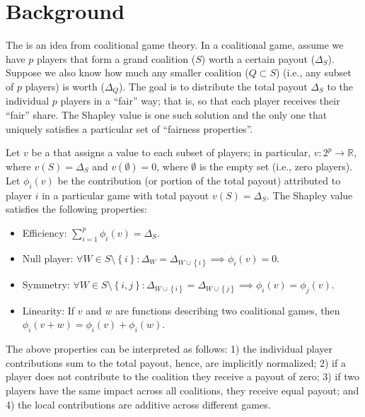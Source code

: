 \section{Background}

The  \citep{shapley-2016-value} is an idea from
coalitional game theory. In a coalitional game, assume we have \(p\)
players that form a grand coalition (\(S\)) worth a certain payout
(\(\Delta_S\)). Suppose we also know how much any smaller coalition
(\(Q \subset S\)) (i.e., any subset of \(p\) players) is worth
(\(\Delta_Q\)). The goal is to distribute the total payout \(\Delta_S\)
to the individual \(p\) players in a ``fair'' way; that is, so that each
player receives their ``fair'' share. The Shapley value is one such
solution and the only one that uniquely satisfies a particular set of
``fairness properties''.

Let \(v\) be a  that assigns a value to
each subset of players; in particular,
\(v : 2^p \rightarrow \mathbb{R}\), where \(v\left(S\right) = \Delta_S\)
and \(v\left(\emptyset\right) = 0\), where \(\emptyset\) is the empty
set (i.e., zero players). Let \(\phi_i\left(v\right)\) be the
contribution (or portion of the total payout) attributed to player \(i\)
in a particular game with total payout \(v\left(S\right) = \Delta_S\).
The Shapley value satisfies the following properties:

\begin{itemize}

  \item Efficiency: $\sum_{i = 1} ^ p \phi_i\left(v\right) = \Delta_S $.
  
  \item Null player: $\forall W \in S \setminus \left\{i\right\}: \Delta_W = \Delta_{W \cup \left\{i\right\}} \implies \phi_i\left(v\right) = 0$.
  
  \item Symmetry: $\forall W \in S \setminus \left\{i, j\right\}: \Delta_{W \cup \left\{i\right\}} = \Delta_{W \cup \left\{j\right\}} \implies \phi_i\left(v\right) = \phi_j\left(v\right)$.
  
  \item Linearity: If $v$ and $w$ are functions describing two coalitional games, then $\phi_i\left(v + w\right) = \phi_i\left(v\right) + \phi_i\left(w\right)$.

\end{itemize}

The above properties can be interpreted as follows: 1) the individual
player contributions sum to the total payout, hence, are implicitly
normalized; 2) if a player does not contribute to the coalition they
receive a payout of zero; 3) if two players have the same impact across
all coalitions, they receive equal payout; and 4) the local
contributions are additive across different games.

